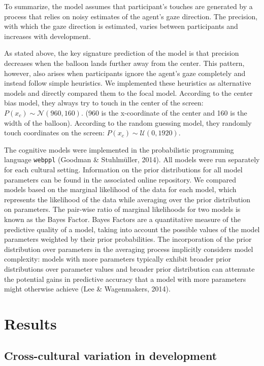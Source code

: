 \documentclass[
  man,floatsintext]{apa6}
\begin{document}
To summarize, the model assumes that participant's touches are generated by a process that relies on noisy estimates of the agent's gaze direction. The precision, with which the gaze direction is estimated, varies between participants and increases with development.

As stated above, the key signature prediction of the model is that precision decreases when the balloon lands further away from the center. This pattern, however, also arises when participants ignore the agent's gaze completely and instead follow simple heuristics. We implemented these heuristics as alternative models and directly compared them to the focal model. According to the center bias model, they always try to touch in the center of the screen: \(P(x_c) \sim \mathcal{N}(960, 160)\). (960 is the x-coordinate of the center and 160 is the width of the balloon). According to the random guessing model, they randomly touch coordinates on the screen: \(P(x_c) \sim \mathcal{U}(0, 1920)\).

The cognitive models were implemented in the probabilistic programming language \texttt{webppl} (Goodman \& Stuhlmüller, 2014). All models were run separately for each cultural setting. Information on the prior distributions for all model parameters can be found in the associated online repository. We compared models based on the marginal likelihood of the data for each model, which represents the likelihood of the data while averaging over the prior distribution on parameters. The pair-wise ratio of marginal likelihoods for two models is known as the Bayes Factor. Bayes Factors are a quantitative measure of the predictive quality of a model, taking into account the possible values of the model parameters weighted by their prior probabilities. The incorporation of the prior distribution over parameters in the averaging process implicitly considers model complexity: models with more parameters typically exhibit broader prior distributions over parameter values and broader prior distribution can attenuate the potential gains in predictive accuracy that a model with more parameters might otherwise achieve (Lee \& Wagenmakers, 2014).

\hypertarget{results}{%
\section{Results}\label{results}}

\hypertarget{cross-cultural-variation-in-development}{%
\subsection{Cross-cultural variation in development}\label{cross-cultural-variation-in-development}}
\end{document}
